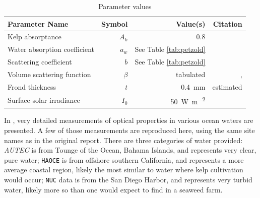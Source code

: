 \documentclass[ms,cpyr,lof,lot]{uathesis}
\begin{document}
\begin{table}
  \centering
  \caption{Parameter values}
  \begin{tabular}{lrrr}
    \toprule
    Parameter Name & Symbol & Value(s) & Citation \\ 
    \midrule
    Kelp absorptance & $A_k$ & 0.8 & \cite{colombo-pallotta_photosynthetic_2006} \\%
    Water absorption coefficient & $a_w$ & See Table \ref{tab:petzold} & \cite{petzold_volume_1972} \\%
    Scattering coefficient & $b$  & See Table \ref{tab:petzold} & \cite{petzold_volume_1972} \\%
    Volume scattering function & $\beta$ & tabulated & \cite{petzold_volume_1972,sokolov_parameterization_2010}, \\%
    Frond thickness & $t$ & \SI{0.4}{\mm} & estimated \\
    Surface solar irradiance & $I_0$ & \SI{50}{\W\per\m\squared} & \cite{broch_modelling_2012}  \\%
    \bottomrule
  \end{tabular}
  \label{tab:params}
\end{table}

In \citep{petzold_volume_1972}, very detailed measurements of optical properties in various ocean waters are presented.
A few of those measurements are reproduced here, using the same site names as in the original report.
There are three categories of water provided: \textit{AUTEC} is from Tounge of the Ocean, Bahama Islands,
and represents very clear, pure water; \texttt{HAOCE} is from offshore southern California, and represents a more average coastal region,
likely the most similar to water where kelp cultivation would occur; \texttt{NUC} data is from the San Diego Harbor, and represents very turbid water,
likely more so than one would expect to find in a seaweed farm.
\end{document}
